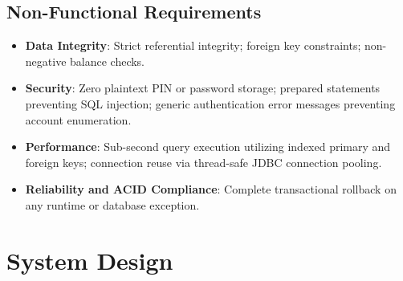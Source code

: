\documentclass[11pt,a4paper]{report}
\begin{document}
\subsection{Non-Functional Requirements}
\begin{itemize}
    \item \textbf{Data Integrity}: Strict referential integrity; foreign key constraints; non-negative balance checks.
    \item \textbf{Security}: Zero plaintext PIN or password storage; prepared statements preventing SQL injection; generic authentication error messages preventing account enumeration.
    \item \textbf{Performance}: Sub-second query execution utilizing indexed primary and foreign keys; connection reuse via thread-safe JDBC connection pooling.
    \item \textbf{Reliability and ACID Compliance}: Complete transactional rollback on any runtime or database exception.
\end{itemize}

\newpage

\section{System Design}
\end{document}
